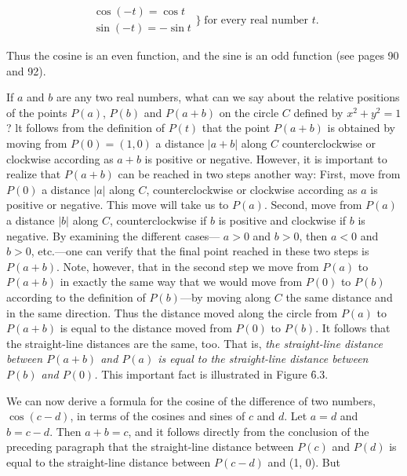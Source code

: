 \begin{theorem} %
$$
\begin{array}{l}
\cos(- t) = \cos t  \\
\sin(- t) = - \sin t
\end{array}
  \} \; \mbox{for every real number $t$.}
$$
\end{theorem}

Thus the cosine is an even function, and the sine is an odd function (see pages 90 and 92).

If $a$ and $b$ are any two real numbers, what can we say about the relative positions of the points
$P(a)$, $P(b)$ and $P(a + b)$ on the circle $C$ defined by $x^2 + y^2 = 1$ ? lt follows from the definition of $P(t)$ that the point $P(a + b)$ is obtained by moving from $P(0) = (1, 0)$ a distance $|a + b|$ along $C$ counterclockwise or clockwise according as $a + b$ is positive or negative. However, it is important to realize that $P(a + b)$ can be reached in two steps another way: First, move from $P(0)$ a distance $|a|$ along $C$, counterclockwise or clockwise according as $a$ is positive or negative. This move will take us to $P(a)$. Second, move from $P(a)$ a distance $|b|$ along $C$, counterclockwise if $b$ is positive and clockwise if $b$ is negative. By examining the different cases--- $a > 0$ and $b > 0$, then $a < 0$ and $b > 0$, etc.---one can verify that the final point reached in these two steps is $P(a + b)$. Note, however, that in the
second step we move from $P(a)$ to $P(a + b)$ in exactly the same way that we would move from
$P(0)$ to $P(b)$ according to the definition of $P(b)$---by moving along $C$ the same distance and in the same direction. Thus the distance moved along the circle from $P(a)$ to $P(a + b)$ is equal to the distance moved from $P(0)$ to $P(b)$. It follows that the straight-line distances are the same, too. That is, \textit{the straight-line distance between $P(a + b)$ and $P(a)$ is equal to the straight-line distance between $P(b)$ and $P(0)$.} This important fact is illustrated in Figure \f{6.3}.



We can now derive a formula for the cosine of the difference of two numbers, $\cos(c-d)$, in terms of the cosines and sines of $c$ and $d$. Let $a = d$ and $b = c - d$. Then $a + b = c$, and it follows directly from the conclusion of the preceding paragraph that the straight-line distance between $P(c)$ and $P(d)$ is equal to the straight-line distance between $P(c - d)$ and (1, 0). But



